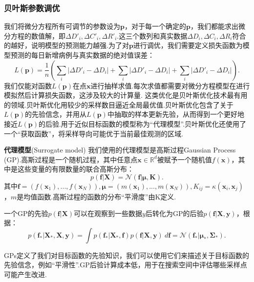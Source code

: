 \documentclass{whutmod}
\begin{document}
	\subsubsection{贝叶斯参数调优}
	我们将微分方程所有可调节的参数设为$\mathbf{p}$，对于每一个确定的$\mathbf{p}$，我们都能求出微分方程的数值解，即$\Delta D'_i,\Delta C'_i,\Delta R'_i$.这三个数列和真实数据$\Delta D_i,\Delta C_i,\Delta R_i$符合的越好，说明模型的预测能力越强.为了对$\mathbf{p}$进行调优，我们需要定义损失函数为模型预测的每日新增病例与真实数据的绝对值误差：
	\begin{equation}
		L(\mathbf{p})=\frac{1}{n}(\sum_{i} |\Delta D'_i-\Delta D_i|+\sum_{i} |\Delta D'_i-\Delta D_i|+\sum_{i} |\Delta D'_i-\Delta D_i|).
		\end{equation}
	我们仅能对函数$L(\mathbf{p})$在点$\mathbf{x}$进行抽样求值.每次求值都需要对微分方程模型在进行模拟然后计算损失函数，这涉及较大的计算量.
	这类优化是贝叶斯优化技术最有用的领域.贝叶斯优化用较少的采样数目逼近全局最优值.贝叶斯优化包含了关于$L(\mathbf{p})$的先验信念，并用从$L(\mathbf{p})$中抽取的样本更新先验，从而得到一个更好地接近$L(\mathbf{p})$的后验.用于近似目标函数的模型称为“代理模型”.贝叶斯优化还使用了一个“获取函数”，将采样导向可能优于当前最佳观测的区域.
	
	\textbf{代理模型}(Surrogate model)
	我们使用的代理模型是高斯过程Gaussian Process (GP).高斯过程是一个随机过程，其中任意点$\mathbf{x} \in \mathbb{R}^d$被赋予一个随机值$f(\mathbf{x})$，其中是这些变量的有限数量的联合高斯分布：
	\begin{equation}
		p(\mathbf{f} \lvert \mathbf{X}) = \mathcal{N}(\mathbf{f} \lvert \boldsymbol\mu, \mathbf{K})\label{eq1}.
	\end{equation}
	其中$ \mathbf{f} = (f(\mathbf{x}_1),...,f(\mathbf{x}_N)), \boldsymbol\mu = (m(\mathbf{x}_1),...,m(\mathbf{x}_N)) , K_{ij} = \kappa(\mathbf{x}_i,\mathbf{x}_j)$，$m$是均值函数.高斯过程的函数的分布“平滑度”由K定义.

	一个GP的先验$p(\mathbf{f} \lvert \mathbf{X})$可以在观察到一些数据$y$后转化为GP的后验$p(\mathbf{f} \lvert \mathbf{X},\mathbf{y})$，根据：
	\begin{equation}
			p(\mathbf{f}_* \lvert \mathbf{X}_*,\mathbf{X},\mathbf{y})= \int{p(\mathbf{f}_* \lvert \mathbf{X}_*,\mathbf{f})p(\mathbf{f} \lvert \mathbf{X},\mathbf{y})}\ d\mathbf{f}= \mathcal{N}(\mathbf{f}_* \lvert \boldsymbol{\mu}_*, \boldsymbol{\Sigma}_*).
			\label{eq2}
	\end{equation}
	
	GPs定义了我们对目标函数的先验知识，我们可以使用它们来描述关于目标函数的先验信念，例如“平滑性”.GP后验计算成本低，用于在搜索空间中评估哪些采样点可能产生改进.
\end{document}

